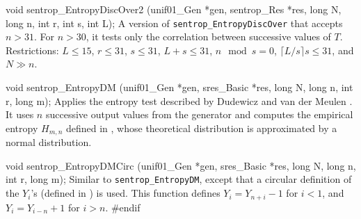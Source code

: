 void sentrop_EntropyDiscOver2 (unif01_Gen *gen, sentrop_Res *res,
                               long N, long n, int r, int s, int L);
\endcode
\tab
  A version
  of {\tt sentrop\_EntropyDiscOver} that accepts $n > 31$.
  For $n > 30$, it tests only the correlation between successive values 
  of $T$.
  Restrictions: $L \le 15$, $r \le 31$, $ s \le 31$, $L + s \le 31$,
  $n \mod s =0$, $\lceil L/s\rceil s \le 31$, and $N \gg n$.
\endtab
\code


void sentrop_EntropyDM (unif01_Gen *gen, sres_Basic *res,
                        long N, long n, int r, long m);
\endcode
\tab
  Applies the entropy test
  described by Dudewicz and van der Meulen \cite{rDUD81b,rDUD95a}.
  It uses $n$ successive output values from the generator and computes
  the empirical entropy $H_{m,n}$ defined in \cite{rDUD81b,rDUD95a},
  whose theoretical distribution is approximated by a normal distribution.
\endtab
\code


void sentrop_EntropyDMCirc (unif01_Gen *gen, sres_Basic *res,
                            long N, long n, int r, long m);
\endcode
\tab
  Similar to {\tt sentrop\_EntropyDM}, except
  that  a  circular
  definition of the $Y_i$'s (defined in \cite{rDUD81b,rDUD95a}) is used. 
  This function defines $Y_i = Y_{n+i} - 1$ for $i < 1$, and
  $Y_i = Y_{i-n} + 1$ for $i > n$.
\endtab
\code
\hide
#endif
\endhide
\endcode
